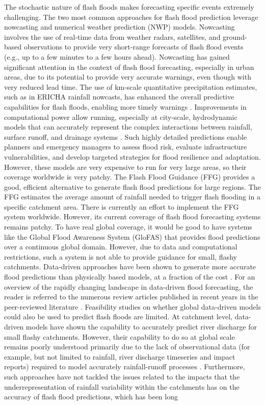 \documentclass[nhess, manuscript]{copernicus}
\begin{document}
The stochastic nature of flash floods makes forecasting specific events extremely challenging. The two most common approaches for flash flood prediction leverage nowcasting and numerical weather prediction (NWP) models. Nowcasting involves the use of real-time data from weather radars, satellites, and ground-based observations to provide very short-range forecasts of flash flood events (e.g., up to a few minutes to a few hours ahead). Nowcasting has gained significant attention in the context of flash flood forecasting, especially in urban areas, due to its potential to provide very accurate warnings, even though with very reduced lead time. The use of km-scale quantitative precipitation estimates, such as in ERICHA rainfall nowcasts, has enhanced the overall predictive capabilities for flash floods, enabling more timely warnings \citep{Park_2019}. Improvements in computational power allow running, especially at city-scale, hydrodynamic models that can accurately represent the complex interactions between rainfall, surface runoff, and drainage systems \citep{Xing_2019}. Such highly detailed predictions enable planners and emergency managers to assess flood risk, evaluate infrastructure vulnerabilities, and develop targeted strategies for flood resilience and adaptation. However, these models are very expensive to run for very large areas, so their coverage worldwide is very patchy. The Flash Flood Guidance (FFG) provides a good, efficient alternative to generate flash flood predictions for large regions. The FFG estimates the average amount of rainfall needed to trigger flash flooding in a specific catchment area. There is currently an effort to implement the FFG system worldwide. However, its current coverage of flash flood forecasting systems remains patchy. To have real global coverage, it would be good to have systems like the Global Flood Awareness System (GloFAS) that provides flood predictions over a continuous global domain. However, due to data and computational restrictions, such a system is not able to provide guidance for small, flashy catchments. Data-driven approaches have been shown to generate more accurate flood predictions than physically based models, at a fraction of the cost \citep{Kratzert_2019, Nearing_2024}. For an overview of the rapidly changing landscape in data-driven flood forecasting, the reader is referred to the numerous review articles published in recent years in the peer-reviewed literature \citep{Ghorpade_2021, Karim_2023, Khairudin_2022, Kumar_2023, Maspo_2020, Rathnasiri_2023}. Feasibility studies on whether global data-driven models could also be used to predict flash floods are limited. At catchment level, data-driven models have shown the capability to accurately predict river discharge for small flashy catchments. However, their capability to do so at global scale remains poorly understood primarily due to the lack of observational data (for example, but not limited to rainfall, river discharge timeseries and impact reports) required to model accurately rainfall-runoff processes \citep{Malik_2024, Zhao_2022}. Furthermore, such approaches have not tackled the issues related to the impacts that the underrepresentation of rainfall variability within the catchments has on the accuracy of flash flood predictions, which has been long 
\end{document}
